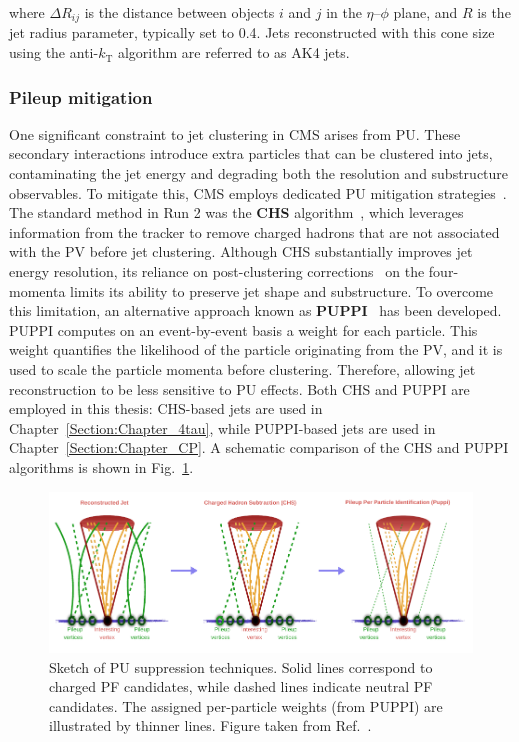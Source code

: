 where $\Delta R_{ij}$ is the distance between objects $i$ and $j$ in the $\eta$–$\phi$ plane, and $R$ is the jet radius parameter, typically set to 0.4. Jets reconstructed with this cone size using the anti-$k_\mathrm{T}$ algorithm are referred to as AK4 jets.

\subsubsection{Pileup mitigation}

One significant constraint to jet clustering in \ac{CMS} arises from \ac{PU}. These secondary interactions introduce extra particles that can be clustered into jets, contaminating the jet energy and degrading both the resolution and substructure observables. To mitigate this, \ac{CMS} employs dedicated \ac{PU} mitigation strategies~\cite{PU_Mitigation}. The standard method in Run 2 was the \textbf{\ac{CHS}} algorithm~\cite{ParticleFlow}, which leverages information from the tracker to remove charged hadrons that are not associated with the \ac{PV} before jet clustering. Although \ac{CHS} substantially improves jet energy resolution, its reliance on post-clustering corrections~\cite{JetEnergyCalibration} on the four-momenta limits its ability to preserve jet shape and substructure. To overcome this limitation, an alternative approach known as \textbf{\ac{PUPPI}}~\cite{PUPPI} has been developed. \ac{PUPPI} computes on an event-by-event basis a weight for each particle. This weight quantifies the likelihood of the particle originating from the \ac{PV}, and it is used to scale the particle momenta before clustering. Therefore, allowing jet reconstruction to be less sensitive to \ac{PU} effects. Both \ac{CHS} and \ac{PUPPI} are employed in this thesis: \ac{CHS}-based jets are used in Chapter~\ref{Section:Chapter_4tau}, while \ac{PUPPI}-based jets are used in Chapter~\ref{Section:Chapter_CP}. A schematic comparison of the \ac{CHS} and \ac{PUPPI} algorithms is shown in Fig.~\ref{Figure:Chapter4_Pileup_Schematic}.

\begin{figure}[h]
\centering
\includegraphics[width=\textwidth]{Figures/Chapter4/PU_Shematic.pdf}
\caption[Sketch of pileup suppression techniques]{
Sketch of \ac{PU} suppression techniques. Solid lines correspond to charged \ac{PF} candidates, while dashed lines indicate neutral \ac{PF} candidates. The assigned per-particle weights (from \ac{PUPPI}) are illustrated by thinner lines. Figure taken from Ref.~\cite{Jet_Reconstruction_Run2_Run3}.}
\label{Figure:Chapter4_Pileup_Schematic}
\end{figure}

